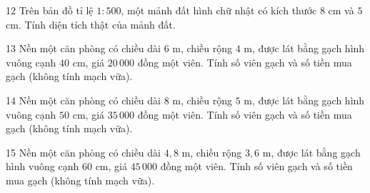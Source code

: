 \gap
\begin{probbox}{12}{\relax}
Trên bản đồ tỉ lệ $1:500$, một mảnh đất hình chữ nhật có kích thước $8$ cm và $5$ cm. Tính diện tích thật của mảnh đất.
\end{probbox}
\gap
\begin{probbox}{13}{\relax}
Nền một căn phòng có chiều dài $6$ m, chiều rộng $4$ m, được lát bằng gạch hình vuông cạnh $40$ cm, giá $20\,000$ đồng một viên. Tính số viên gạch và số tiền mua gạch (không tính mạch vữa).
\end{probbox}
\gap
\begin{probbox}{14}{\relax}
Nền một căn phòng có chiều dài $8$ m, chiều rộng $5$ m, được lát bằng gạch hình vuông cạnh $50$ cm, giá $35\,000$ đồng một viên. Tính số viên gạch và số tiền mua gạch (không tính mạch vữa).
\end{probbox}
\gap
\begin{probbox}{15}{\relax}
Nền một căn phòng có chiều dài $4{,}8$ m, chiều rộng $3{,}6$ m, được lát bằng gạch hình vuông cạnh $60$ cm, giá $45\,000$ đồng một viên. Tính số viên gạch và số tiền mua gạch (không tính mạch vữa).
\end{probbox}

